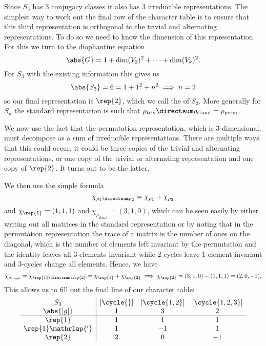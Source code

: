 Since \(S_3\) has 3 conjugacy classes it also has 3 irreducible
representations.
The simplest way to work out the final row of the character table is to
ensure that this third representation is orthogonal to the trivial and
alternating representations.
To do so we need to know the dimension of this representation.
For this we turn to the diophantine equation
\begin{equation}
    \abs{G} = 1 + \dim(V_2)^2 + \dotsb + \dim(V_k)^2.
\end{equation}
For \(S_3\) with the existing information this gives us
\begin{equation}
    \abs{S_3} = 6 = 1 + 1^2 + n^2 \implies n = 2
\end{equation}
so our final representation is \(\rep{2}\), which we call the
 of \(S_3\).
More generally for \(S_n\) the standard representation is such that
\(\rho_{\mathrm{triv}} \directsum \rho_{\mathrm{stand}} =
\rho_{\mathrm{perm}}\).

We now use the fact that the permutation representation, which is
3-dimensional, must decompose as a sum of irreducible representations.
There are multiple ways that this could occur, it could be three copies of
the trivial and alternating representations, or one copy of the trivial or
alternating representation and one copy of \(\rep{2}\).
It turns out to be the latter.

We then use the simple formula
\begin{equation}
    \chi_{\rho_1 \directsum \rho_2} = \chi_{\rho_1} + \chi_{\rho_2}
\end{equation}
and \(\chi_{\rep{1}} = (1, 1, 1)\) and \(\chi_{\rho_{\mathrm{stand}}} = (3,
1, 0)\), which can be seen easily by either writing out all matrices in the
standard representation or by noting that in the permutation representation the
trace of a matrix is the number of ones on the diagonal, which is the number of
elements left invariant by the permutation and the identity leaves all 3
elements invariant while 2-cycles leave 1 element invariant and 3-cycles change
all elements.
Hence, we have
\begin{equation}
    \chi_{\rho_{\mathrm{stand}}} = \chi_{\rep{1} \directsum \rep{2}} =
    \chi_{\rep{1}} + \chi_{\rep{2}} \implies \chi_{\rep{2}} = (3, 1, 0) - (1, 1, 1)
    = (2, 0, -1).
\end{equation}
This allows us to fill out the final line of our character table:
\begin{equation}
    \begin{array}{c|ccc}
        S_3 & [\cycle{}] & [\cycle{1,2}] & [\cycle{1,2,3}]\\
        \abs{[g]} & 1 & 3 & 2 \\ \hline
        \rep{1} & 1 & 1 & 1 \\
        \rep{1}\mathrlap{'} & 1 & -1 & 1\\
        \rep{2} & 2 & 0 & -1
    \end{array}
\end{equation}

